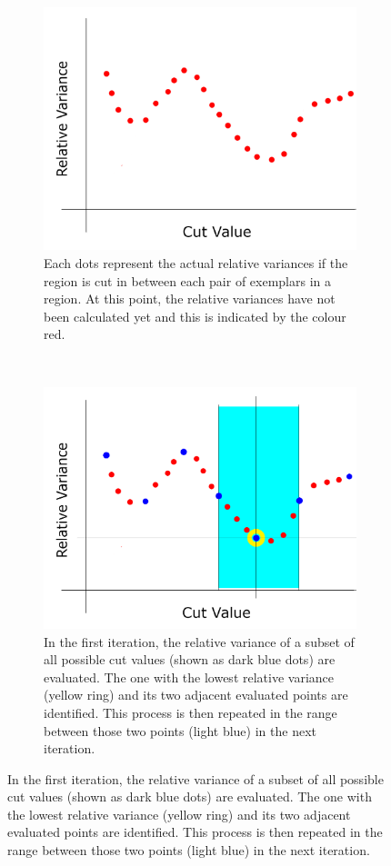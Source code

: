 \begin{figure}[!htbp]
	\centering
	\begin{subfigure}[t]{0.45\textwidth}
		\centering
		\includegraphics[width=1.0 \textwidth]{"fig/cbla/divide-and-zoom-in_1"}
		\caption{Each dots represent the actual relative variances if the region is cut in between each pair of exemplars in a region. At this point, the relative variances have not been calculated yet and this is indicated by the colour red.}
		\label{fig:divide-and-zoom-in_1}
	\end{subfigure}	
	~
	\begin{subfigure}[t]{0.45\textwidth}
		\centering
		\includegraphics[width=1.0 \textwidth]{"fig/cbla/divide-and-zoom-in_2"}
		\caption{In the first iteration, the relative variance of a subset of all possible cut values (shown as dark blue dots) are evaluated. The one with the lowest relative variance (yellow ring) and its two adjacent evaluated points are identified. This process is then repeated in the range between those two points (light blue) in the next iteration.}
		\label{fig:divide-and-zoom-in_2}
	\end{subfigure}	
	

\end{figure}
